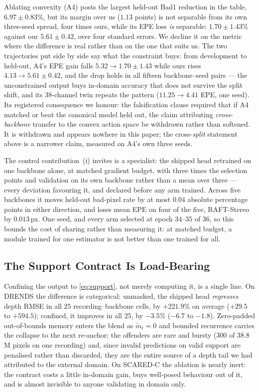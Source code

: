 \documentclass[letterpaper,10pt,conference]{ieeeconf}
\begin{document}
Ablating convexity (A4) posts the largest held-out Bad1 reduction in the table,
$6.97\pm0.83\%$, but its margin over us ($1.13$ points) is not separable from
its own three-seed spread, four times ours, while its EPE loss \emph{is}
separable: $1.70\pm1.43\%$ against our $5.61\pm0.42$, over four standard
errors. We decline it on the metric where the difference is real rather than on
the one that suits us. The two
trajectories put side by side say what the constraint buys: from development
to held-out, A4's EPE gain falls $5.32 \to 1.70\pm1.43$ while ours rises
$4.13 \to 5.61\pm0.42$, and the drop holds in all fifteen backbone--seed pairs
--- the unconstrained output buys in-domain accuracy that does not survive the
split shift, and its $38$-channel twin repeats the pattern ($11.25 \to 4.41$ EPE, one
seed). Its
registered consequence we honour: the falsification clause required that if A4
matched or beat the canonical model held out, the claim attributing
\emph{cross-backbone} transfer to the convex action space be withdrawn rather
than softened. It is withdrawn and appears nowhere in this paper; the
cross-\emph{split} statement above is a narrower claim, measured on A4's own
three seeds.

The control contribution~(i) invites is a specialist: the shipped head
retrained on one backbone alone, at matched gradient budget, with three times
the selection points and validation on its own backbone rather than a mean over
three --- every deviation favouring it, and declared before any arm trained.
Across five backbones it moves held-out bad-pixel rate by at most $0.04$
absolute percentage points in either direction, and loses mean EPE on four of the five, RAFT-Stereo by
$0.013$\,px. One seed, and every arm selected at epoch $34$--$35$ of $36$, so
this bounds the cost of sharing rather than measuring it: at matched budget, a
module trained for one estimator is not better than one trained for all.

\subsection{The Support Contract Is Load-Bearing}
\label{sec:support}
\label{sec:masking}

Confining the output to \eqref{eq:support}, not merely computing it, is a
single line. On DRENDS the difference is categorical: unmasked, the shipped head
\emph{regresses} depth RMSE in all $25$ recording--backbone cells, by
$+221.9\%$ on average ($+29.5$ to $+594.5$); confined, it improves in all $25$,
by $-3.5\%$ ($-6.7$ to $-1.8$). Zero-padded out-of-bounds memory enters the
blend as $\widetilde m_t=0$ and bounded recurrence carries the collapse to the
next re-anchor; the offenders are rare and bursty ($300$ of $38.8$M pixels on
one recording) and, since invalid predictions on valid support are penalised
rather than discarded, they are the entire source of a depth tail we had
attributed to the external domain. On SCARED-C the ablation is nearly inert:
the contract costs a little in-domain gain, buys well-posed behaviour out of
it, and is almost invisible to anyone validating in domain only.
\end{document}
